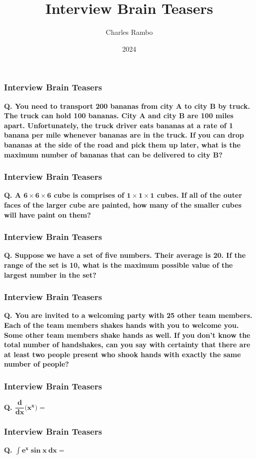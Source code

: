 \documentclass{beamer}
\title{Interview Brain Teasers}
\author{Charles Rambo}
\institute{UCLA Anderson}
\date{2024}
\begin{document}



\begin{frame}[t]
\frametitle{Interview Brain Teasers}
{\bf Q. You need to transport 200 bananas from city A to city B by truck. The truck can hold 100 bananas. City A and city B are 100 miles apart. Unfortunately, the truck driver eats bananas at a rate of 1 banana per mile whenever bananas are in the truck. If you can drop bananas at the side of the road and pick them up later, what is the maximum number of bananas that can be delivered to city B?}

\end{frame}

\begin{frame}[t]
\frametitle{Interview Brain Teasers}
{\bf Q. A $\boldsymbol{6\times 6\times 6}$ cube is comprises of $\boldsymbol{1\times 1\times 1}$ cubes. If all of the outer faces of the larger cube are painted, how many of the smaller cubes will have paint on them?}

\end{frame}

\begin{frame}[t]
\frametitle{Interview Brain Teasers}
{\bf Q. Suppose we have a set of five numbers. Their average is 20. If the range of the set is 10, what is the maximum possible value of the largest number in the set?}

\end{frame}

\begin{frame}[t]
\frametitle{Interview Brain Teasers}
{\bf Q. You are invited to a welcoming party with 25 other team members. Each of the team members shakes hands with you to welcome you. Some other team members shake hands as well. If you don't know the total number of handshakes, can you say with certainty that there are at least two people present who shook hands with exactly the same number of people?}

\end{frame}


\begin{frame}[t]
\frametitle{Interview Brain Teasers}
{\bf Q. $\boldsymbol{\dfrac{d}{dx}\Big(x^x\Big) = }$}

\end{frame}

\begin{frame}[t]
\frametitle{Interview Brain Teasers}
{\bf Q. $\boldsymbol{\displaystyle\int e^x \sin x\ dx = }$}

\end{frame}
\end{document}
